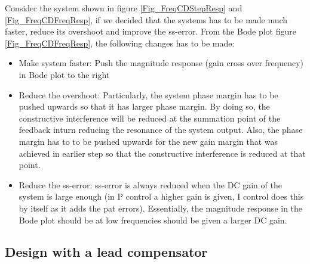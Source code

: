 Consider the system shown in figure \ref{Fig_FreqCDStepResp} and \ref{Fig_FreqCDFreqResp}, if we decided that the systems has to be made much faster, reduce its overshoot and improve the ss-error. From the Bode plot figure \ref{Fig_FreqCDFreqResp}, the following changes has to be made:
\begin{itemize}
	\item Make system faster: Push the magnitude response (gain cross over frequency) in Bode plot to the right
	\item Reduce the overshoot: Particularly, the system phase margin has to be pushed upwards so that it has larger phase margin. By doing so, the constructive interference will be reduced at the summation point of the feedback inturn reducing the resonance of the system output. Also, the phase margin has to to be pushed upwards for the new gain margin that was achieved in earlier step so that the constructive interference is reduced at that point.
	\item Reduce the ss-error: ss-error is always reduced when the DC gain of the system is large enough (in P control a higher gain is given, I control does this by itself as it adds the pat errors). Essentially, the magnitude response in the Bode plot should be at low frequencies should be given a larger DC gain.
\end{itemize}

\subsection{Design with a lead compensator}

